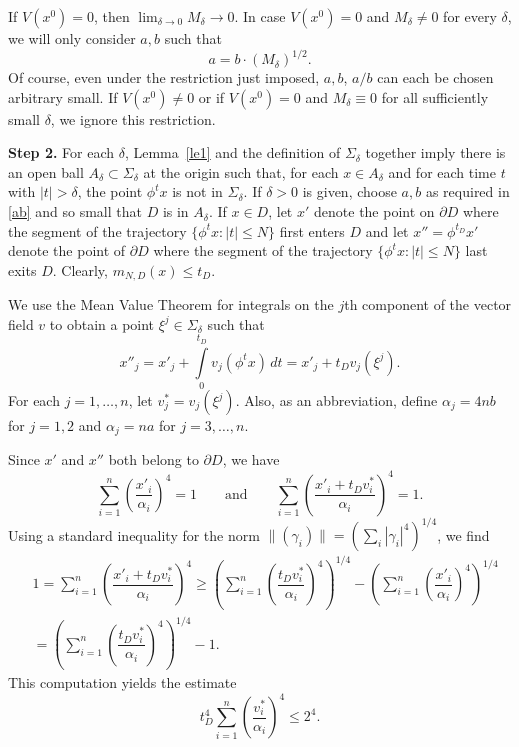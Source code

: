 \begin{pf}
If $V(x^0)=0$, then $\lim_{\delta\to 0}M_\delta\to 0$. In case
$V(x^0)=0$ and
$M_\delta\neq 0$ for every $\delta$, we will only
consider $a,b$ such that
\begin{equation}\label{ab}
a=b \cdot \left(M_\delta\right)^{1/2}.
\end{equation}
Of course,  even under the restriction just imposed, $a,b$,
$a/b$ can each
be chosen arbitrary small.
If $V(x^0)\neq 0$ or if  $V(x^0)= 0$ and
$M_\delta\equiv 0$ for
all sufficiently small $\delta$, we ignore this restriction.

{\bf Step 2.} For each $\delta$, Lemma~\ref{le1} and the definition of
$\Sigma_\delta$ together imply there is
an open ball $A_\delta \subset\Sigma_\delta$
at the origin such that,
for each $x\in A_\delta$ and for each time $t$ with $|t|>\delta$,
the point $\phi^tx$ is not in $\Sigma_\delta$.
If $\delta>0$ is given,
choose $a,b$ as required in \eqref{ab}
and so small that $D$ is in
$A_\delta$. If  $x\in D$, let $x'$
denote the point on $\partial D$
where the segment of the trajectory
$\{\phi^tx: |t|\leq N\}$ first enters
$D$ and let $x''=\phi^{t_D}x'$ denote
the point of $\partial D$ where the
segment of the trajectory $\{\phi^tx: |t|\leq N\}$ last exits
$D$. Clearly, $m_{N,D}(x)\leq t_D$.

We use the Mean Value Theorem for integrals
on the $j$th component
of the vector field $v$ to obtain a point $ \xi^j\in\Sigma_\delta$
such that
\[ x''_j=x'_j+\int\limits_0^{t_D} v_j(\phi^t x) \,dt=
x'_j+t_D v_j(\xi^j).\]
For each $j=1,\dots,n$,  let $ v_j^*=v_j(\xi^j)$.
Also, as an abbreviation, define $\alpha_j=4nb$ for $j=1,2$ and
$\alpha_j=na$ for $j=3,\dots, n$.

Since $x'$ and $x''$ both belong to
$\partial D$, we have
$$\sum_{i=1}^n\left(\dfrac{x'_i}{\alpha_i}\right)^4=1
\qquad \text{and}\qquad
\sum_{i=1}^n\left(\dfrac{x'_i+t_Dv_i^*}{\alpha_i}\right)^4=1.
$$
Using a standard inequality for the norm
$\|(\gamma_i)\|=\left(\sum_i|\gamma_i|^4\right)^{1/4}$, we find
\begin{eqnarray*}
& 1=  \sum_{i=1}^n\left(\dfrac{x'_i+t_Dv_i^*}{\alpha_i}\right)^4
\geq  \left(\sum_{i=1}^n\left(\dfrac{t_Dv_i^*}{\alpha_i}\right)^4
\right)^{1/4} -
\left(\sum_{i=1}^n\left(\dfrac{{x'}_i}{\alpha_i}\right)^4
\right)^{1/4}\\
& =  \left(\sum_{i=1}^n\left(\dfrac{t_Dv_i^*}{\alpha_i}\right)^4
\right)^{1/4}-1.
\end{eqnarray*}
This computation yields the estimate
\begin{equation}\label{tD}
t_D^4\sum_{i=1}^n\left(\dfrac{v^*_i}{\alpha_i}\right)^4\leq 2^4.
\end{equation}


\end{pf}
